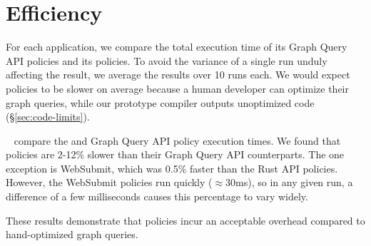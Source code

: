 \section{Efficiency}
\label{sec:efficiency}
For each application, we compare the total execution time of its Graph Query API policies
and its \syslang{} policies.
%
To avoid the variance of a single run unduly affecting the result, we average the results over 10 runs each.
%
We would expect \syslang{} policies to be slower on average because 
a human developer can optimize their graph queries,
while our prototype compiler outputs unoptimized code (\S\ref{sec:code-limits}).

~ compare the \syslang{} and Graph Query API policy execution times.
%
We found that \syslang{} policies are 2-12\% slower than their Graph Query API counterparts.
%
The one exception is WebSubmit, which was 0.5\% faster than the Rust API policies.
%
However, the WebSubmit policies run quickly ($\approx$30ms),
so in any given run, a difference of a few milliseconds causes this percentage to vary widely.

These results demonstrate that \syslang{} policies 
incur an acceptable overhead compared to hand-optimized graph queries.


